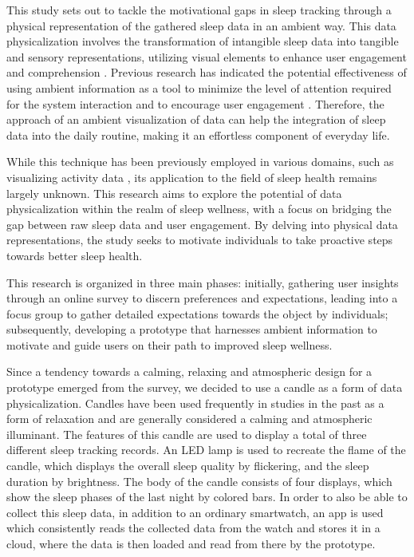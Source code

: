 \documentclass[
  a4paper,  %
  twoside,  %
  bibliography=totoc,
  headsepline,
  cleardoublepage=empty,
  parskip=half,
  draft=false
]{scrbook}
\begin{document}
This study sets out to tackle the motivational gaps in sleep tracking through a physical representation of the gathered sleep data in an ambient way. This data physicalization involves the transformation of intangible sleep data into tangible and sensory representations, utilizing visual elements to enhance user engagement and comprehension \cite{Oppotunieites_Challenges_DataPhysicalization}. Previous research has indicated the potential effectiveness of using ambient information as a tool to minimize the level of attention required for the system interaction and to encourage user engagement \cite{Fostering_Engagement, Econundrum, Roam-IO}.
Therefore, the approach of an ambient visualization of data can help the integration of sleep data into the daily routine, making it an effortless component of everyday life.

While this technique has been previously employed in various domains, such as visualizing activity data \cite{LOOP, Shelfie, 10_Design_Themes, TastyBeats, Activity_Scupltures}, its application to the field of sleep health remains largely unknown. This research aims to explore the potential of data physicalization within the realm of sleep wellness, with a focus on bridging the gap between raw sleep data and user engagement. By delving into physical data representations, the study seeks to motivate individuals to take proactive steps towards better sleep health.

This research is organized in three main phases: initially, gathering user insights through an online survey to discern preferences and expectations, leading into a focus group to gather detailed expectations towards the object by individuals; subsequently, developing a prototype that harnesses ambient information to motivate and guide users on their path to improved sleep wellness.

Since a tendency towards a calming, relaxing and atmospheric design for a prototype emerged from the survey, we decided to use a candle as a form of data physicalization. Candles have been used frequently in studies in the past as a form of relaxation \cite{Candle_as_relaxation, Candle_reduce_stress} and are generally considered a calming and atmospheric illuminant. The features of this candle are used to display a total of three different sleep tracking records. An LED lamp is used to recreate the flame of the candle, which displays the overall sleep quality by flickering, and the sleep duration by brightness. The body of the candle consists of four displays, which show the sleep phases of the last night by colored bars. In order to also be able to collect this sleep data, in addition to an ordinary smartwatch, an app is used which consistently reads the collected data from the watch and stores it in a cloud, where the data is then loaded and read from there by the prototype.
\end{document}
